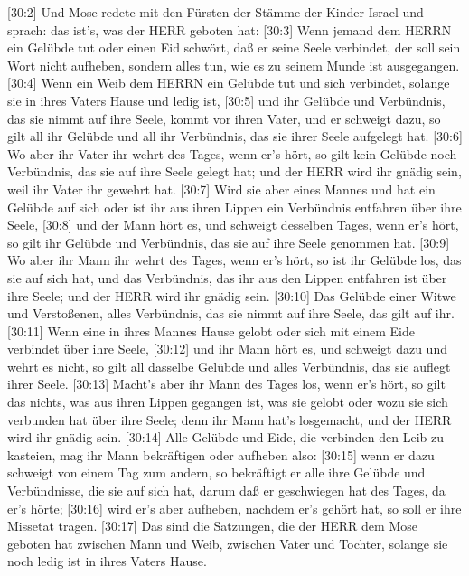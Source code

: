  {[}30:2{]} Und Mose redete mit den Fürsten der Stämme der
Kinder Israel und sprach: das ist's, was der HERR geboten hat:
 {[}30:3{]} Wenn jemand dem HERRN ein Gelübde tut oder einen
Eid schwört, daß er seine Seele verbindet, der soll sein Wort nicht
aufheben, sondern alles tun, wie es zu seinem Munde ist ausgegangen.
 {[}30:4{]} Wenn ein Weib dem HERRN ein Gelübde tut und sich
verbindet, solange sie in ihres Vaters Hause und ledig ist, 
{[}30:5{]} und ihr Gelübde und Verbündnis, das sie nimmt auf ihre Seele,
kommt vor ihren Vater, und er schweigt dazu, so gilt all ihr Gelübde und
all ihr Verbündnis, das sie ihrer Seele aufgelegt hat. 
{[}30:6{]} Wo aber ihr Vater ihr wehrt des Tages, wenn er's hört, so
gilt kein Gelübde noch Verbündnis, das sie auf ihre Seele gelegt hat;
und der HERR wird ihr gnädig sein, weil ihr Vater ihr gewehrt hat.
 {[}30:7{]} Wird sie aber eines Mannes und hat ein Gelübde
auf sich oder ist ihr aus ihren Lippen ein Verbündnis entfahren über
ihre Seele,  {[}30:8{]} und der Mann hört es, und schweigt
desselben Tages, wenn er's hört, so gilt ihr Gelübde und Verbündnis, das
sie auf ihre Seele genommen hat.  {[}30:9{]} Wo aber ihr
Mann ihr wehrt des Tages, wenn er's hört, so ist ihr Gelübde los, das
sie auf sich hat, und das Verbündnis, das ihr aus den Lippen entfahren
ist über ihre Seele; und der HERR wird ihr gnädig sein. 
{[}30:10{]} Das Gelübde einer Witwe und Verstoßenen, alles Verbündnis,
das sie nimmt auf ihre Seele, das gilt auf ihr. 
{[}30:11{]} Wenn eine in ihres Mannes Hause gelobt oder sich mit einem
Eide verbindet über ihre Seele,  {[}30:12{]} und ihr Mann
hört es, und schweigt dazu und wehrt es nicht, so gilt all dasselbe
Gelübde und alles Verbündnis, das sie auflegt ihrer Seele. 
{[}30:13{]} Macht's aber ihr Mann des Tages los, wenn er's hört, so gilt
das nichts, was aus ihren Lippen gegangen ist, was sie gelobt oder wozu
sie sich verbunden hat über ihre Seele; denn ihr Mann hat's losgemacht,
und der HERR wird ihr gnädig sein.  {[}30:14{]} Alle
Gelübde und Eide, die verbinden den Leib zu kasteien, mag ihr Mann
bekräftigen oder aufheben also:  {[}30:15{]} wenn er dazu
schweigt von einem Tag zum andern, so bekräftigt er alle ihre Gelübde
und Verbündnisse, die sie auf sich hat, darum daß er geschwiegen hat des
Tages, da er's hörte;  {[}30:16{]} wird er's aber aufheben,
nachdem er's gehört hat, so soll er ihre Missetat tragen. 
{[}30:17{]} Das sind die Satzungen, die der HERR dem Mose geboten hat
zwischen Mann und Weib, zwischen Vater und Tochter, solange sie noch
ledig ist in ihres Vaters Hause.

